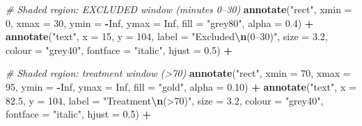 \documentclass[
]{article}
\newenvironment{Shaded}{\begin{snugshade}}{\end{snugshade}}
\newcommand{\AttributeTok}[1]{\textcolor[rgb]{0.13,0.29,0.53}{#1}}
\newcommand{\CommentTok}[1]{\textcolor[rgb]{0.56,0.35,0.01}{\textit{#1}}}
\newcommand{\ConstantTok}[1]{\textcolor[rgb]{0.56,0.35,0.01}{#1}}
\newcommand{\DecValTok}[1]{\textcolor[rgb]{0.00,0.00,0.81}{#1}}
\newcommand{\FloatTok}[1]{\textcolor[rgb]{0.00,0.00,0.81}{#1}}
\newcommand{\FunctionTok}[1]{\textcolor[rgb]{0.13,0.29,0.53}{\textbf{#1}}}
\newcommand{\NormalTok}[1]{#1}
\newcommand{\SpecialCharTok}[1]{\textcolor[rgb]{0.81,0.36,0.00}{\textbf{#1}}}
\newcommand{\StringTok}[1]{\textcolor[rgb]{0.31,0.60,0.02}{#1}}
\begin{document}
\begin{Shaded}
\begin{Highlighting}[]
  \CommentTok{\# Shaded region: EXCLUDED window (minutes 0–30)}
  \FunctionTok{annotate}\NormalTok{(}\StringTok{"rect"}\NormalTok{, }\AttributeTok{xmin =} \DecValTok{0}\NormalTok{, }\AttributeTok{xmax =} \DecValTok{30}\NormalTok{,}
           \AttributeTok{ymin =} \SpecialCharTok{{-}}\ConstantTok{Inf}\NormalTok{, }\AttributeTok{ymax =} \ConstantTok{Inf}\NormalTok{,}
           \AttributeTok{fill =} \StringTok{"grey80"}\NormalTok{, }\AttributeTok{alpha =} \FloatTok{0.4}\NormalTok{) }\SpecialCharTok{+}
  \FunctionTok{annotate}\NormalTok{(}\StringTok{"text"}\NormalTok{, }\AttributeTok{x =} \DecValTok{15}\NormalTok{, }\AttributeTok{y =} \DecValTok{104}\NormalTok{,}
           \AttributeTok{label =} \StringTok{"Excluded}\SpecialCharTok{\textbackslash{}n}\StringTok{(0–30\textquotesingle{})"}\NormalTok{,}
           \AttributeTok{size =} \FloatTok{3.2}\NormalTok{, }\AttributeTok{colour =} \StringTok{"grey40"}\NormalTok{,}
           \AttributeTok{fontface =} \StringTok{"italic"}\NormalTok{, }\AttributeTok{hjust =} \FloatTok{0.5}\NormalTok{) }\SpecialCharTok{+}

  \CommentTok{\# Shaded region: treatment window (\textgreater{}70\textquotesingle{})}
  \FunctionTok{annotate}\NormalTok{(}\StringTok{"rect"}\NormalTok{, }\AttributeTok{xmin =} \DecValTok{70}\NormalTok{, }\AttributeTok{xmax =} \DecValTok{95}\NormalTok{,}
           \AttributeTok{ymin =} \SpecialCharTok{{-}}\ConstantTok{Inf}\NormalTok{, }\AttributeTok{ymax =} \ConstantTok{Inf}\NormalTok{,}
           \AttributeTok{fill =} \StringTok{"gold"}\NormalTok{, }\AttributeTok{alpha =} \FloatTok{0.10}\NormalTok{) }\SpecialCharTok{+}
  \FunctionTok{annotate}\NormalTok{(}\StringTok{"text"}\NormalTok{, }\AttributeTok{x =} \FloatTok{82.5}\NormalTok{, }\AttributeTok{y =} \DecValTok{104}\NormalTok{,}
           \AttributeTok{label =} \StringTok{"Treatment}\SpecialCharTok{\textbackslash{}n}\StringTok{(\textgreater{}70\textquotesingle{})"}\NormalTok{,}
           \AttributeTok{size =} \FloatTok{3.2}\NormalTok{, }\AttributeTok{colour =} \StringTok{"grey40"}\NormalTok{,}
           \AttributeTok{fontface =} \StringTok{"italic"}\NormalTok{, }\AttributeTok{hjust =} \FloatTok{0.5}\NormalTok{) }\SpecialCharTok{+}


\end{Highlighting}
\end{Shaded}
\end{document}
